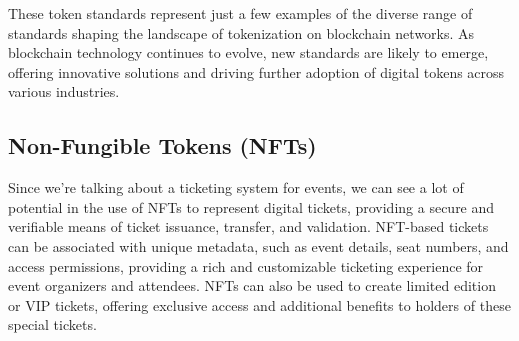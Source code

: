 These token standards represent just a few examples of the diverse range of standards shaping the landscape of tokenization on blockchain networks. As blockchain technology continues to evolve, new standards are likely to emerge, offering innovative solutions and driving further adoption of digital tokens across various industries.

\subsection{Non-Fungible Tokens (NFTs)}

Since we're talking about a ticketing system for events, we can see a lot of potential in the use of NFTs to represent digital tickets, providing a secure and verifiable means of ticket issuance, transfer, and validation. NFT-based tickets can be associated with unique metadata, such as event details, seat numbers, and access permissions, providing a rich and customizable ticketing experience for event organizers and attendees. NFTs can also be used to create limited edition or VIP tickets, offering exclusive access and additional benefits to holders of these special tickets.
